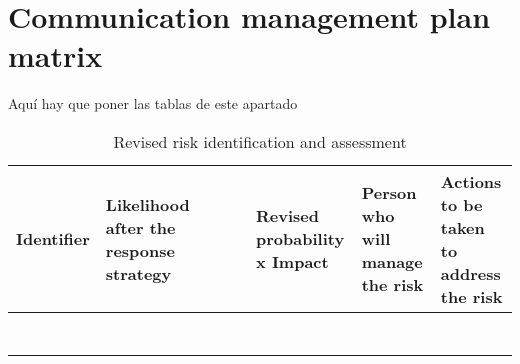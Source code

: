 \section{Communication management plan matrix}
\begin{landscape}
	
Aquí hay que poner las tablas de este apartado

\begin{table}[H]
	\centering
	\begin{tabular}{| >{\raggedright\arraybackslash}p{2.4cm}  | >{\raggedright\arraybackslash}p{2.4cm} | >{\raggedright\arraybackslash}p{2.4cm} | >{\raggedright\arraybackslash}p{2.4cm} | >{\raggedright\arraybackslash}p{2.4cm} | >{\raggedright\arraybackslash}p{2.4cm} | >{\raggedright\arraybackslash}p{2.4cm} | >{\raggedright\arraybackslash}p{2.4cm} |  }
		

\toprule [2pt]
		Identifier & Likelihood after the response strategy  &    &     &     &  Revised probability x Impact   &  Person who will manage the risk  & Actions to be taken to address the risk \\  
\midrule [1.5pt]
	
		&   &    &   &     &   &  &  \\  
		
		\hline
		
		&   &    &   &     &   &   &\\  
		
		\hline
		
		&   &    &   &     &   &   &\\  
		
		\hline
		
		&   &    &   &     &   &   &\\  
		
		\hline
		
		&   &    &   &     &   &   &\\  
		
		\hline
		
		&   &    &   &     &   &   &\\  
		
		\hline
		
		&   &    &   &     &   &   &\\  
		
		\bottomrule[2pt]
		
	\end{tabular}
	\caption{Revised risk identification and assessment}
\end{table}

\vspace*{\fill}


\end{landscape}